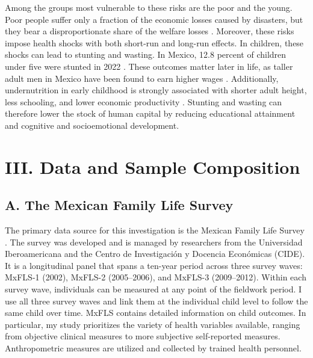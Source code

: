 Among the groups most vulnerable to these risks are the poor and the young. Poor people suffer only a fraction of the economic losses caused by disasters, but they bear a disproportionate share of the welfare losses \parencite{hallegatteUnbreakableBuildingResilience2017}. Moreover, these risks impose health shocks with both short-run and long-run effects. In children, these shocks can lead to stunting and wasting. In Mexico, 12.8 percent of children under five were stunted in 2022 \parencite{cuevas-nasuEstadoNutricionNinas2023}. These outcomes matter later in life, as taller adult men in Mexico have been found to earn higher wages \parencite{voglHeightSkillsLabor2014}. Additionally, undernutrition in early childhood is strongly associated with shorter adult height, less schooling, and lower economic productivity \parencite{victoraMaternalChildUndernutrition2008}. Stunting and wasting can therefore lower the stock of human capital by reducing educational attainment and cognitive and socioemotional development.

\section*{III. Data and Sample Composition}\label{sec:III}

\subsection*{A. The Mexican Family Life Survey}

The primary data source for this investigation is the Mexican Family Life Survey \parencite[MxFLS;][]{rubalcavaUsersGuideMexican2006,rubalcavaUsersGuideMexican2013}. The survey was developed and is managed by researchers from the Universidad Iberoamericana and the Centro de Investigaci\'on y Docencia Econ\'omicas (CIDE). It is a longitudinal panel that spans a ten-year period across three survey waves: MxFLS-1 (2002), MxFLS-2 (2005--2006), and MxFLS-3 (2009--2012). Within each survey wave, individuals can be measured at any point of the fieldwork period. I use all three survey waves and link them at the individual child level to follow the same child over time. MxFLS contains detailed information on child outcomes. In particular, my study prioritizes the variety of health variables available, ranging from objective clinical measures to more subjective self-reported measures. Anthropometric measures are utilized and collected by trained health personnel.

